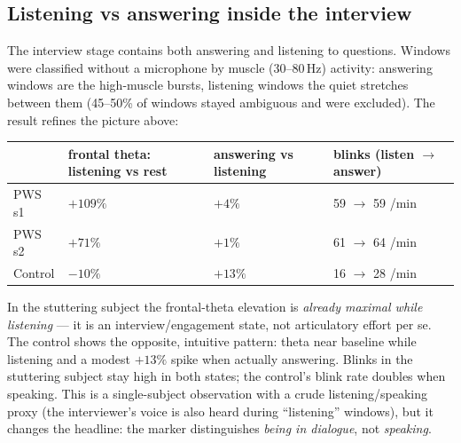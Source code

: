 \documentclass[11pt,a4paper]{article}
\begin{document}
\subsection*{Listening vs answering inside the interview}
The interview stage contains both answering and listening to questions. Windows were classified
without a microphone by muscle (30--80\,Hz) activity: answering windows are the high-muscle bursts,
listening windows the quiet stretches between them (45--50\% of windows stayed ambiguous and were
excluded). The result refines the picture above:
\begin{center}\small
\begin{tabular}{@{}llll@{}}
\toprule
& frontal theta: listening vs rest & answering vs listening & blinks (listen $\to$ answer) \\
\midrule
PWS s1 & $+109\%$ & $+4\%$ & 59 $\to$ 59 /min \\
PWS s2 & $+71\%$ & $+1\%$ & 61 $\to$ 64 /min \\
Control & $-10\%$ & $+13\%$ & 16 $\to$ 28 /min \\
\bottomrule
\end{tabular}
\end{center}
In the stuttering subject the frontal-theta elevation is \emph{already maximal while listening} ---
it is an interview/engagement state, not articulatory effort per se. The control shows the opposite,
intuitive pattern: theta near baseline while listening and a modest $+13\%$ spike when actually
answering. Blinks in the stuttering subject stay high in both states; the control's blink rate
doubles when speaking. This is a single-subject observation with a crude listening/speaking proxy
(the interviewer's voice is also heard during ``listening'' windows), but it changes the headline:
the marker distinguishes \emph{being in dialogue}, not \emph{speaking}.
\end{document}
